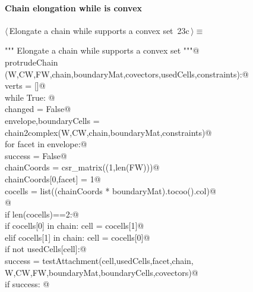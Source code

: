 \documentclass[11pt,oneside]{article}	%
\begin{document}
\paragraph{Chain elongation while is convex}

\begin{flushleft} \small \label{scrap30}
\protect{}$\langle\,$Elongate a chain while supports a convex set\nobreak\ {\footnotesize 23c}$\,\rangle\equiv$
\vspace{-1ex}
\begin{list}{}{} \item
\mbox{}\verb@""" Elongate a chain while supports a convex set """@\\
\mbox{}\verb@def protrudeChain (W,CW,FW,chain,boundaryMat,covectors,usedCells,constraints):@\\
\mbox{}\verb@   verts = []@\\
\mbox{}\verb@   while True: @\\
\mbox{}\verb@      changed = False@\\
\mbox{}\verb@      envelope,boundaryCells = chain2complex(W,CW,chain,boundaryMat,constraints)@\\
\mbox{}\verb@      for facet in envelope:@\\
\mbox{}\verb@         success = False@\\
\mbox{}\verb@         chainCoords = csr_matrix((1,len(FW)))@\\
\mbox{}\verb@         chainCoords[0,facet] = 1@\\
\mbox{}\verb@         cocells = list((chainCoords * boundaryMat).tocoo().col)@\\
\mbox{}\verb@         @\\
\mbox{}\verb@         if len(cocells)==2:@\\
\mbox{}\verb@            if cocells[0] in chain: cell = cocells[1]@\\
\mbox{}\verb@            elif cocells[1] in chain: cell = cocells[0]@\\
\mbox{}\verb@            if not usedCells[cell]:@\\
\mbox{}\verb@               success = testAttachment(cell,usedCells,facet,chain, \@\\
\mbox{}\verb@                        W,CW,FW,boundaryMat,boundaryCells,covectors)@\\
\mbox{}\verb@            if success: @\\

\end{list}
\end{flushleft}
\end{document}
